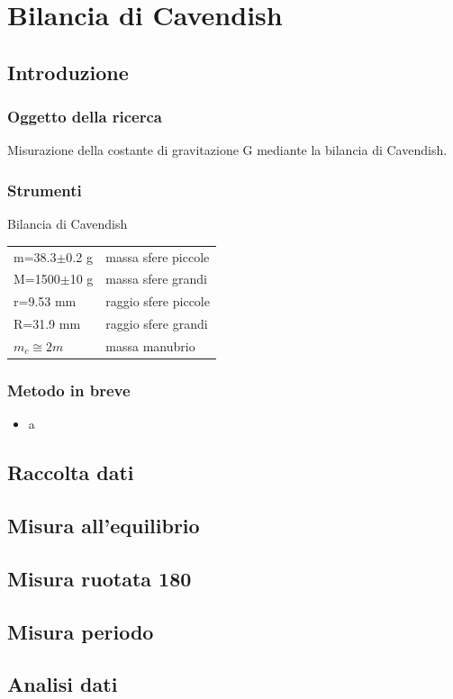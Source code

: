 \documentclass[a4paper,10pt]{report}
\begin{document}
\chapter{Bilancia di Cavendish}
\section{Introduzione}
\subsection{Oggetto della ricerca}
Misurazione della costante di gravitazione G mediante la bilancia di Cavendish.
\subsection{Strumenti}
Bilancia di Cavendish\\

\begin{tabular}{ll}
m=38.3$\pm$0.2 g & massa sfere piccole\\
M=1500$\pm$10 g	 & massa sfere grandi\\
r=9.53 mm & raggio sfere piccole\\
R=31.9 mm	 & raggio sfere grandi\\
$m_c\cong 2m$ & massa manubrio\\
\end{tabular}

\subsection{Metodo in breve}
\begin{itemize}
\item a
\end{itemize}
\section{Raccolta dati}
\section{Misura all'equilibrio}
\section{Misura ruotata 180}
\section{Misura periodo}
\section{Analisi dati}
\end{document}
